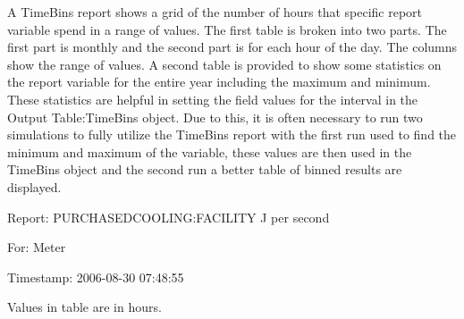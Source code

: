 A TimeBins report shows a grid of the number of hours that specific report variable spend in a range of values. The first table is broken into two parts. The first part is monthly and the second part is for each hour of the day. The columns show the range of values. A second table is provided to show some statistics on the report variable for the entire year including the maximum and minimum. These statistics are helpful in setting the field values for the interval in the Output Table:TimeBins object. Due to this, it is often necessary to run two simulations to fully utilize the TimeBins report with the first run used to find the minimum and maximum of the variable, these values are then used in the TimeBins object and the second run a better table of binned results are displayed.

Report: PURCHASEDCOOLING:FACILITY J per second

For: Meter

Timestamp: 2006-08-30 07:48:55

Values in table are in hours.

